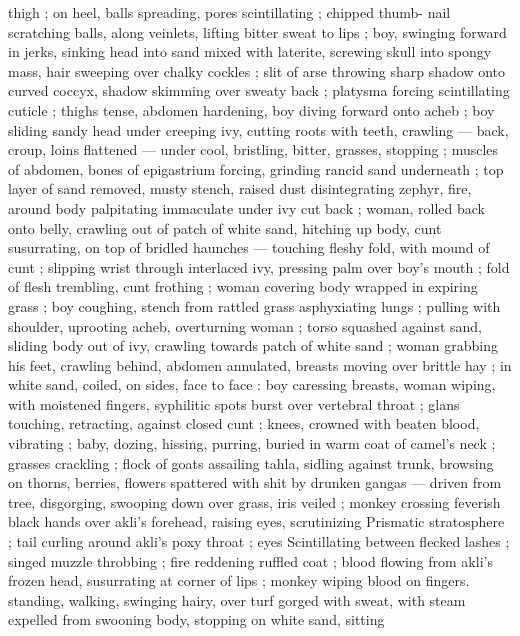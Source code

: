 thigh ; on heel, balls spreading, pores scintillating ; chipped thumb- 
nail scratching balls, along veinlets, lifting bitter sweat to lips ; boy, 
swinging forward in jerks, sinking head into sand mixed with laterite, 
screwing skull into spongy mass, hair sweeping over chalky cockles 
; slit of arse throwing sharp shadow onto curved coccyx, shadow 
skimming over sweaty back ; platysma forcing scintillating cuticle ; 
thighs tense, abdomen hardening, boy diving forward onto acheb ; 
boy sliding sandy head under creeping ivy, cutting roots with teeth, 
crawling --- back, croup, loins flattened --- under cool, bristling, 
bitter, grasses, stopping ; muscles of abdomen, bones of 
epigastrium forcing, grinding rancid sand underneath ; top layer of 
sand removed, musty stench, raised dust disintegrating zephyr, fire, 
around body palpitating immaculate under ivy cut back ; woman, 
rolled back onto belly, crawling out of patch of white sand, hitching 
up body, cunt susurrating, on top of bridled haunches --- touching 
fleshy fold, with mound of cunt ; slipping wrist through interlaced ivy, 
pressing palm over boy's mouth ; fold of flesh trembling, cunt 
frothing ; woman covering body wrapped in expiring grass ; boy 
coughing, stench from rattled grass asphyxiating lungs ; pulling with 
shoulder, uprooting acheb, overturning woman ; torso squashed 
against sand, sliding body out of ivy, crawling towards patch of white 
sand ; woman grabbing his feet, crawling behind, abdomen 
annulated, breasts moving over brittle hay ; in white sand, coiled, on 
sides, face to face : boy caressing breasts, woman wiping, with 
moistened fingers, syphilitic spots burst over vertebral throat ; glans 
touching, retracting, against closed cunt ; knees, crowned with 
beaten blood, vibrating ; baby, dozing, hissing, purring, buried in 
warm coat of camel's neck ; grasses crackling ; flock of goats 
assailing tahla, sidling against trunk, browsing on thorns, berries, 
flowers spattered with shit by drunken gangas --- driven from tree, 
disgorging, swooping down over grass, iris veiled ; monkey crossing 
feverish black hands over akli's forehead, raising eyes, scrutinizing 
Prismatic stratosphere ; tail curling around akli's poxy throat ; eyes 
Scintillating between flecked lashes ; singed muzzle throbbing ; fire 
reddening ruffled coat ; blood flowing from akli's frozen head, 
susurrating at corner of lips ; monkey wiping blood on fingers. 
standing, walking, swinging hairy, over turf gorged with sweat, with 
steam expelled from swooning body, stopping on white sand, sitting 
